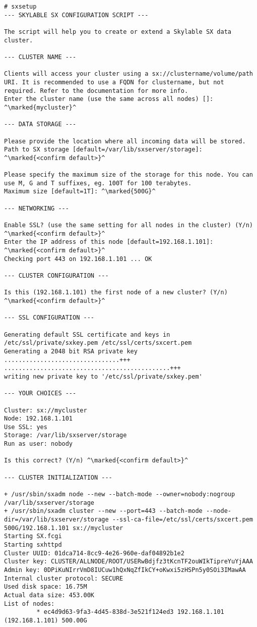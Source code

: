 \begin{lstlisting}
# sxsetup
--- SKYLABLE SX CONFIGURATION SCRIPT ---

The script will help you to create or extend a Skylable SX data
cluster.

--- CLUSTER NAME ---

Clients will access your cluster using a sx://clustername/volume/path
URI. It is recommended to use a FQDN for clustername, but not
required. Refer to the documentation for more info.
Enter the cluster name (use the same across all nodes) []: ^\marked{mycluster}^

--- DATA STORAGE ---

Please provide the location where all incoming data will be stored.
Path to SX storage [default=/var/lib/sxserver/storage]: ^\marked{<confirm default>}^

Please specify the maximum size of the storage for this node. You can
use M, G and T suffixes, eg. 100T for 100 terabytes.
Maximum size [default=1T]: ^\marked{500G}^

--- NETWORKING ---

Enable SSL? (use the same setting for all nodes in the cluster) (Y/n)
^\marked{<confirm default>}^
Enter the IP address of this node [default=192.168.1.101]: ^\marked{<confirm default>}^
Checking port 443 on 192.168.1.101 ... OK

--- CLUSTER CONFIGURATION ---

Is this (192.168.1.101) the first node of a new cluster? (Y/n)
^\marked{<confirm default>}^

--- SSL CONFIGURATION ---

Generating default SSL certificate and keys in
/etc/ssl/private/sxkey.pem /etc/ssl/certs/sxcert.pem
Generating a 2048 bit RSA private key
................................+++
..............................................+++
writing new private key to '/etc/ssl/private/sxkey.pem'

--- YOUR CHOICES ---

Cluster: sx://mycluster
Node: 192.168.1.101
Use SSL: yes
Storage: /var/lib/sxserver/storage
Run as user: nobody

Is this correct? (Y/n) ^\marked{<confirm default>}^

--- CLUSTER INITIALIZATION ---

+ /usr/sbin/sxadm node --new --batch-mode --owner=nobody:nogroup /var/lib/sxserver/storage
+ /usr/sbin/sxadm cluster --new --port=443 --batch-mode --node-dir=/var/lib/sxserver/storage --ssl-ca-file=/etc/ssl/certs/sxcert.pem 500G/192.168.1.101 sx://mycluster
Starting SX.fcgi
Starting sxhttpd
Cluster UUID: 01dca714-8cc9-4e26-960e-daf04892b1e2
Cluster key: CLUSTER/ALLNODE/ROOT/USERwBdjfz3tKcnTF2ouWIkTipreYuYjAAA
Admin key: 0DPiKuNIrrVmD8IUCuw1hQxNqZfIkCY+oKwxi5zHSPn5y0SOi3IMawAA
Internal cluster protocol: SECURE
Used disk space: 16.75M
Actual data size: 453.00K
List of nodes:
         * ec4d9d63-9fa3-4d45-838d-3e521f124ed3 192.168.1.101 (192.168.1.101) 500.00G


\end{lstlisting}
